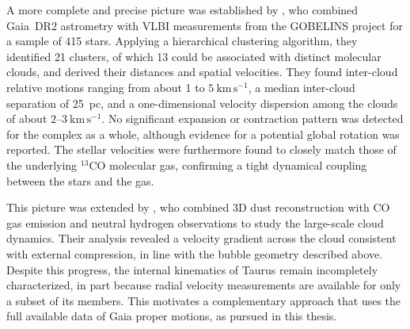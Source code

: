 A more complete and precise picture was established by \citet{Galli2019}, who combined Gaia~DR2
astrometry with VLBI measurements from the GOBELINS project for a sample of 415 stars. Applying
a hierarchical clustering algorithm, they identified 21 clusters, of which 13 could be
associated with distinct molecular clouds, and derived their distances and spatial velocities.
They found inter-cloud relative motions ranging from about 1 to $5~\mathrm{km\,s^{-1}}$, a
median inter-cloud separation of 25~pc, and a one-dimensional velocity dispersion among the
clouds of about $2\text{--}3~\mathrm{km\,s^{-1}}$. No significant expansion or contraction
pattern was detected for the complex as a whole, although evidence for a potential global
rotation was reported. The stellar velocities were furthermore found to closely match those of
the underlying $^{13}$CO molecular gas, confirming a tight dynamical coupling between the stars
and the gas.

This picture was extended by \citet{Soler2023}, who combined 3D dust reconstruction with CO gas
emission and neutral hydrogen observations to study the large-scale cloud dynamics. Their
analysis revealed a velocity gradient across the cloud consistent with external compression, in
line with the bubble geometry described above. Despite this progress, the internal kinematics of
Taurus remain incompletely characterized, in part because radial velocity measurements are
available for only a subset of its members. This motivates a complementary approach that uses
the full available data of Gaia proper motions, as pursued in this thesis.
